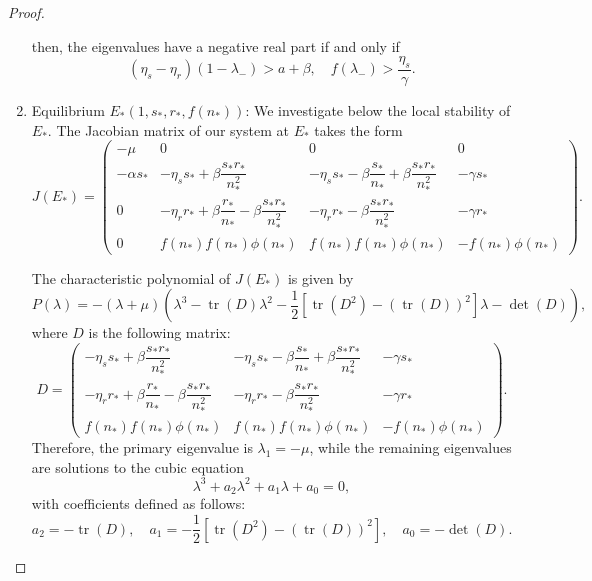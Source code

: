 \begin{proof}
\begin{enumerate}
then, the eigenvalues have a negative real part if and only if
\[
(\eta_{s} - \eta_{r})(1 - \lambda_{-}) > a + \beta, \quad f(\lambda_{-}) > \frac{\eta_{s}}{\gamma}.
\]
		
		\item Equilibrium \(E_{*}(1,s_{*},r_{*},f(n_{*}))\): We investigate below the local stability of \(E_{*}\). The Jacobian matrix of our system at \(E_{*}\) takes the form 
		\[
		J(E_{*}) = \begin{pmatrix}
			-\mu & 0 & 0 & 0 \\ 
			-\alpha s_{*} & -\eta_{s}s_{*} + \beta\dfrac{s_{*}r_{*}}{n_{*}^{2}} & -\eta_{s}s_{*} - \beta\dfrac{s_{*}}{n_{*}} + \beta\dfrac{s_{*}r_{*}}{n_{*}^{2}} & -\gamma s_{*} \\ 
			0 & -\eta_{r}r_{*} + \beta\dfrac{r_{*}}{n_{*}} - \beta\dfrac{s_{*}r_{*}}{n_{*}^{2}} & -\eta_{r}r_{*} - \beta\dfrac{s_{*}r_{*}}{n_{*}^{2}} & -\gamma r_{*} \\ 
			0 & f(n_{*})f(n_{*})\phi(n_{*}) & f(n_{*})f(n_{*})\phi(n_{*}) & -f(n_{*})\phi(n_{*})
		\end{pmatrix}.
		\]
		
		The characteristic polynomial of \(J(E_{*})\) is given by
		$$P(\lambda) = -(\lambda + \mu)\left(
		\lambda^{3} - \operatorname{tr}(D)\lambda^{2} 
		- \frac{1}{2}\left[\operatorname{tr}(D^{2}) - (\operatorname{tr}(D))^{2}\right]\lambda 
		- \det(D)
		\right),$$
		where \(D\) is the following matrix:
		\[
		D = \begin{pmatrix}
			-\eta_{s}s_{*} + \beta\dfrac{s_{*}r_{*}}{n_{*}^{2}} & 
			-\eta_{s}s_{*} - \beta\dfrac{s_{*}}{n_{*}} + \beta\dfrac{s_{*}r_{*}}{n_{*}^{2}} & 
			-\gamma s_{*} \\[2ex]
			-\eta_{r}r_{*} + \beta\dfrac{r_{*}}{n_{*}} - \beta\dfrac{s_{*}r_{*}}{n_{*}^{2}} & 
			-\eta_{r}r_{*} - \beta\dfrac{s_{*}r_{*}}{n_{*}^{2}} & 
			-\gamma r_{*} \\[2ex]
			f(n_{*})f(n_{*})\phi(n_{*}) & 
			f(n_{*})f(n_{*})\phi(n_{*}) & 
			-f(n_{*})\phi(n_{*})
		\end{pmatrix}.
		\]
		Therefore, the primary eigenvalue is \(\lambda_{1} = -\mu\), while the remaining eigenvalues are solutions to the cubic equation
		\begin{equation}
			\lambda^{3} + a_{2}\lambda^{2} + a_{1}\lambda + a_{0} = 0, \tag{10}
		\end{equation}
		with coefficients defined as follows:
		\[
		a_{2} = -\operatorname{tr}(D), \quad 
		a_{1} = -\frac{1}{2}\left[\operatorname{tr}(D^{2}) - (\operatorname{tr}(D))^{2}\right], \quad 
		a_{0} = -\det(D).
		\]
		

\end{enumerate}
\end{proof}
